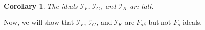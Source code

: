 \documentclass{amsart}
\newtheorem{cor}[thm]{Corollary}
\theoremstyle{definition}
\theoremstyle{definition}
\newcommand{\Fin}{\textrm{Fin}}
\newcommand{\I}{\mathcal I}
\newcommand{\calK}{\mathcal{K}}
\begin{document}
%
%

\begin{cor} \label{tall}
The ideals $\I_F$, $\I_G$, and $\I_K$ are tall.
\end{cor}



Now, we will show that $\I_F$, $\I_G$, and $\I_K$ are $F_{\sigma\delta}$ but not $F_{\sigma}$ ideals.
\end{document}
